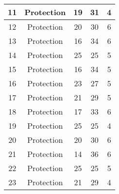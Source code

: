 \documentclass[results.tex]{subfiles}
\begin{document}
\begin{center}
\begin{tabular}{| c || c | c | c | c |}
            \hline
            11                      & Protection                   & 19                     & 31                      & 4                    \\
            \hline
            12                      & Protection                   & 20                     & 30                      & 6                    \\
            \hline
            13                      & Protection                   & 16                     & 34                      & 6                    \\
            \hline
            14                      & Protection                   & 25                     & 25                      & 5                    \\
            \hline
            15                      & Protection                   & 16                     & 34                      & 5                    \\
            \hline
            16                      & Protection                   & 23                     & 27                      & 5                    \\
            \hline
            17                      & Protection                   & 21                     & 29                      & 5                    \\
            \hline
            18                      & Protection                   & 17                     & 33                      & 6                    \\
            \hline
            19                      & Protection                   & 25                     & 25                      & 4                    \\
            \hline
            20                      & Protection                   & 20                     & 30                      & 6                    \\
            \hline
            21                      & Protection                   & 14                     & 36                      & 6                    \\
            \hline
            22                      & Protection                   & 25                     & 25                      & 5                    \\
            \hline
            23                      & Protection                   & 21                     & 29                      & 4                    \\

\end{tabular}
\end{center}
\end{document}
